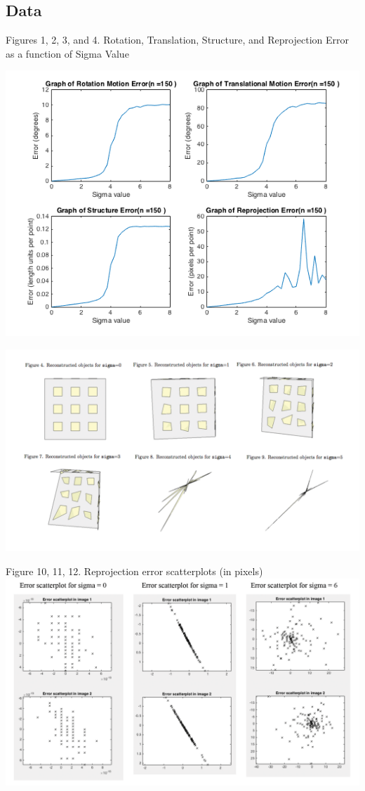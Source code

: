 \documentclass{article}
\begin{document}
\subsection{Data}
\begin{center}
	\begin{center}Figures 1, 2, 3, and 4. Rotation, Translation, Structure, and Reprojection Error as a function of Sigma Value\end{center}
	\includegraphics[width=.7\textwidth,keepaspectratio]{experiment_1_error_plots.png}

	\includegraphics[width=\textwidth,keepaspectratio]{reconstructed_objects.png}
\end{center}


\begin{center}
	Figure 10, 11, 12. Reprojection error scatterplots (in pixels)
	\includegraphics[width=\textwidth, keepaspectratio]{error_scatterplots.png}
\end{center}
\end{document}
